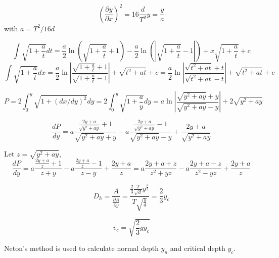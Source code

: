\begin{equation}  
\left(\frac{\partial y}{\partial x}\right)^2= 16\frac{d}{T^2}y =  \frac{y}{a}
\end{equation}
with $a = T^2/16d$

\begin{equation}  
\int \sqrt{1+\frac{a}{t}}dt = \frac{a}{2}\ln\left(\sqrt{1+\frac{a}{t}} +1\right) 
                                              - \frac{a}{2}\ln\left(|\sqrt{1+\frac{a}{t}} -1|\right)
                                             + x\sqrt{1+\frac{a}{t}} + c 
\end{equation}
\begin{equation}  
\int \sqrt{1+\frac{a}{t}}dx = \frac{a}{2}\ln \left| \frac{\sqrt{1+\frac{a}{t}} +1}{\sqrt{1+\frac{a}{t}} -1}\right| 
                                             + \sqrt{t^2+at} + c 
                                             = \frac{a}{2}\ln \left| \frac{\sqrt{t^2+at} +t}{\sqrt{t^2+at} -t}\right| 
                                             + \sqrt{t^2+at} + c 
\end{equation}

\begin{equation}  
P= 2\int_0^y \sqrt{1 + (dx/dy)^2}dy = 2\int_0^y \sqrt{1 + \frac{a}{y}} dy 
= a \ln \left| \frac{\sqrt{y^2 + ay} + y}{\sqrt{y^2 + ay} -  y} \right| 
+ 2\sqrt{y^2 + ay}
\end{equation}

\begin{equation}  
\frac{dP}{dy}= a \frac{\frac{2y + a}{\sqrt{y^2 + ay}} + 1}{\sqrt{y^2 + ay} + y}
                       - a \frac{\frac{2y + a}{\sqrt{y^2+ay}}-1}{\sqrt{y^2 + ay}-y}
                       + \frac{2y + a}{\sqrt{y^2+ay}}
\end{equation}

\noindent Let $z = \sqrt{y^2 + ay}$, 
\begin{equation}  
\frac{dP}{dy} = a \frac{\frac{2y + a}{z} + 1}{z + y} - a \frac{\frac{2y + a}{z}-1}{z-y} + \frac{2y + a}{z}
                       = a \frac{2y + a + z}{z^2 + yz} - a \frac{2y + a - z}{z^2 - yz} + \frac{2y + a}{z}
\end{equation}

\begin{equation}  
D_h = \frac{A}{\frac{\partial A}{\partial y}} = \frac{ \frac{2}{3}\frac{T}{\sqrt{d}}y^{\frac{3}{2}}}{T\sqrt{\frac{y}{d}}} = \frac{2}{3}y_c
\end{equation}

\begin{equation}  
v_c = \sqrt{\frac{2}{3}gy_c}
\end{equation}

\noindent Neton's method is used to calculate normal depth $y_n$ and critical depth $y_c$. 
